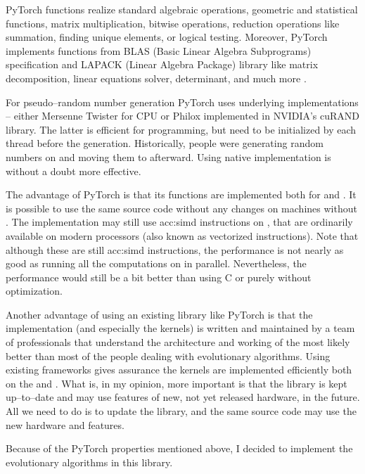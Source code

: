 PyTorch functions realize standard algebraic operations, geometric and statistical functions, matrix multiplication, bitwise operations, reduction operations like summation, finding unique elements, or logical testing. Moreover, PyTorch implements functions from BLAS (Basic Linear Algebra Subprograms) specification and LAPACK (Linear Algebra Package) library like matrix decomposition, linear equations solver, determinant, and much more \citep{PyTorchDoc}.

For pseudo--random number generation PyTorch uses underlying implementations -- either Mersenne Twister for CPU or Philox implemented in NVIDIA's cuRAND library. The latter is efficient for \cuda programming, but need to be initialized by each thread before the generation. Historically, people were generating random numbers on \cpu and moving them to \gpu afterward. Using native \cuda implementation is without a doubt more effective.

The advantage of PyTorch is that its functions are implemented both for \cpu and \gpuns. It is possible to use the same source code without any changes on machines without \gpuns. The implementation may still use \acrshort{acc:simd} instructions on \cpuns, that are ordinarily available on modern processors (also known as vectorized instructions). Note that although these are still \acrshort{acc:simd} instructions, the performance is not nearly as good as running all the computations on \gpu in parallel. Nevertheless, the performance would still be a bit better than using C or \cpp purely without optimization.

Another advantage of using an existing library like PyTorch is that the implementation (and especially the \cuda kernels) is written and maintained by a team of professionals that understand the architecture and working of the \gpu most likely better than most of the people dealing with evolutionary algorithms. Using existing frameworks gives assurance the kernels are implemented efficiently both on the \gpu and \cpuns. What is, in my opinion, more important is that the library is kept up--to--date and may use features of new, not yet released hardware, in the future. All we need to do is to update the library, and the same source code may use the new hardware and features.

Because of the PyTorch properties mentioned above, I decided to implement the evolutionary algorithms in this library.




